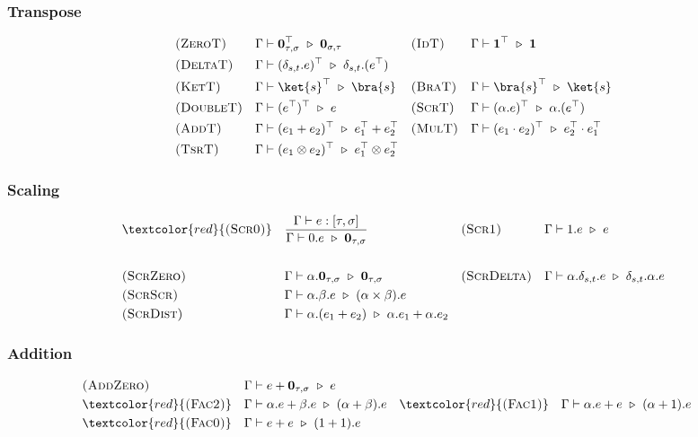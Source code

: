 \subsubsection*{Transpose}
\begin{align*}
  & \textsc{(ZeroT)} && \Gamma \vdash \textbf{0}_{\tau, \sigma}^\top \reduce \textbf{0}_{\sigma, \tau}
  && \textsc{(IdT)} && \Gamma \vdash \mathbf{1}^\top \reduce \mathbf{1} \\
  & \textsc{(DeltaT)} && \Gamma \vdash (\delta_{s,t}.e)^\top \reduce \delta_{s,t}.(e^\top) \\
  & \textsc{(KetT)} && \Gamma \vdash \ket{s}^\top \reduce \bra{s} 
  && \textsc{(BraT)} && \Gamma \vdash \bra{s}^\top \reduce \ket{s} \\
  & \textsc{(DoubleT)} && \Gamma \vdash (e^\top)^\top \reduce e 
  && \textsc{(ScrT)} && \Gamma \vdash (\alpha.e)^\top \reduce \alpha.(e^\top) \\
  & \textsc{(AddT)} && \Gamma \vdash (e_1 + e_2)^\top \reduce e_1^\top + e_2^\top
  && \textsc{(MulT)} && \Gamma \vdash (e_1 \cdot e_2)^\top \reduce e_2^\top \cdot e_1^\top \\
  & \textsc{(TsrT)} && \Gamma \vdash (e_1 \otimes e_2)^\top \reduce e_1^\top \otimes e_2^\top
\end{align*}

\subsubsection*{Scaling}
\begin{align*}
  & \textcolor{red}{\textsc{(Scr0)}} && \frac{\Gamma \vdash e : [\tau, \sigma]}{\Gamma \vdash 0.e \reduce \textbf{0}_{\tau, \sigma}}
  && \textsc{(Scr1)} && \Gamma \vdash 1.e \reduce e \\
  \\
  & \textsc{(ScrZero)} && \Gamma \vdash \alpha.\mathbf{0}_{\tau, \sigma} \reduce \mathbf{0}_{\tau, \sigma}
  && \textsc{(ScrDelta)} && \Gamma \vdash \alpha.\delta_{s, t}.e \reduce \delta_{s, t}.\alpha.e \\
  & \textsc{(ScrScr)} && \Gamma \vdash \alpha.\beta.e \reduce (\alpha \times \beta).e
  \\
  & \textsc{(ScrDist)} && \Gamma \vdash \alpha.(e_1 + e_2) \reduce \alpha.e_1 + \alpha.e_2
\end{align*}

\subsubsection*{Addition}
\begin{align*}
  & \textsc{(AddZero)} && \Gamma \vdash e + \textbf{0}_{\tau, \sigma} \reduce e \\
  & \textcolor{red}{\textsc{(Fac2)}} && 
    \Gamma \vdash \alpha.e + \beta.e \reduce (\alpha + \beta).e
  && \textcolor{red}{\textsc{(Fac1)}} &&
    \Gamma \vdash \alpha.e + e \reduce (\alpha + 1).e \\
  & \textcolor{red}{\textsc{(Fac0)}} &&
    \Gamma \vdash e + e \reduce (1 + 1).e
\end{align*}

